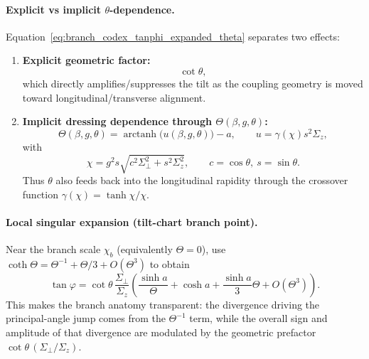 \paragraph{Explicit vs implicit \texorpdfstring{$\theta$}{theta}-dependence.}
Equation~\eqref{eq:branch_codex_tanphi_expanded_theta} separates two effects:
\begin{enumerate}
    \item \textbf{Explicit geometric factor:}
    \begin{equation}
        \cot\theta,
    \end{equation}
    which directly amplifies/suppresses the tilt as the coupling geometry is
    moved toward longitudinal/transverse alignment.
    \item \textbf{Implicit dressing dependence through $\Theta(\beta,g,\theta)$:}
    \begin{equation}
        \Theta(\beta,g,\theta)
        = \operatorname{arctanh}\!\bigl(u(\beta,g,\theta)\bigr)-a,
        \qquad
        u=\gamma(\chi)s^2\Sigma_z,
    \end{equation}
    with
    \begin{equation}
        \chi
        = g^2 s\sqrt{c^2\Sigma_\perp^2+s^2\Sigma_z^2},
        \qquad c=\cos\theta,\ s=\sin\theta.
    \end{equation}
    Thus $\theta$ also feeds back into the longitudinal rapidity through the
    crossover function $\gamma(\chi)=\tanh\chi/\chi$.
\end{enumerate}

\paragraph{Local singular expansion (tilt-chart branch point).}
Near the branch scale $\chi_b$ (equivalently $\Theta=0$), use
$\coth\Theta = \Theta^{-1} + \Theta/3 + O(\Theta^3)$ to obtain
\begin{equation}
    \tan\varphi
    =
    \cot\theta\,\frac{\Sigma_\perp}{\Sigma_z}
    \left(
        \frac{\sinh a}{\Theta}
        + \cosh a
        + \frac{\sinh a}{3}\Theta
        + O(\Theta^3)
    \right).
    \label{eq:branch_codex_tanphi_local_sing}
\end{equation}
This makes the branch anatomy transparent: the divergence driving the
principal-angle jump comes from the $\Theta^{-1}$ term, while the overall sign
and amplitude of that divergence are modulated by the geometric prefactor
$\cot\theta\,(\Sigma_\perp/\Sigma_z)$.

